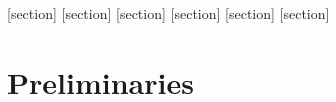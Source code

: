 \documentclass[b5paper,10pt,UTF8]{book}
\numberwithin{equation}{section}
\begin{document}
[section]
\newenvironment{Lemma}[1][]{{\par\normalfont\bfseries 引理~\stepcounter{Lemma}\arabic{Lemma}#1~~}\kaishu}{\par}
[section]
\newenvironment{Property}[1][]{{\par\normalfont\bfseries 性质~\stepcounter{Property}\arabic{Property}#1~~}\kaishu}{\par}
[section]
\newenvironment{Assertion}[1][]{{\par\normalfont\bfseries 断语~\stepcounter{Assertion}\arabic{Assertion}#1~~}\kaishu}{\par}
\newenvironment{Proof}{{\par{\heiti 证明}~~}}{\hfill $\square$ \par\hfill\par}
[section]
\newenvironment{Example}[1][]{{\par\normalfont\bfseries 例~\stepcounter{Example}\arabic{Example}#1~~}\songti}{\hfill\par\hfill\par}
[section]
\newenvironment{Def}[1][]{{\par\normalfont\bfseries 定义~\stepcounter{Def}\arabic{Def}#1~~\songti}}{\par}
\newenvironment{Def*}[1][]{{\par\normalfont\bfseries 定义~#1~~}\kaishu}{\par}
[section]
\newenvironment{Note}[1][]{{\par\normalfont\bfseries 注~\stepcounter{Note}\arabic{Note}#1~~}\songti}{\par}
 \pagestyle{fancy}
 \fancyhf{}
 \fancyhead[EC]{\nouppercase{\heiti\leftmark}}%
 \fancyhead[EL,OR]{\thepage}%
 \fancyhead[OC]{\nouppercase{\heiti\rightmark}}%
 \lfoot{}
 \cfoot{}
 \rfoot{}

\tableofcontents

\clearpage



\chapter{Preliminaries}
\end{document}
